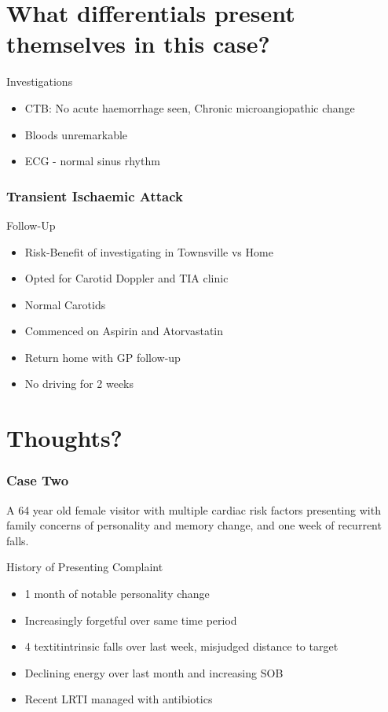 \documentclass[9pt, compress]{beamer}
\begin{document}
     \section{What differentials present themselves in this case?}
     
     \begin{frame}
     	Investigations
        \begin{itemize}
        	\item CTB: No acute haemorrhage seen, Chronic microangiopathic change
            \item Bloods unremarkable
            \item ECG - normal sinus rhythm
        \end{itemize}
     \end{frame}
     
     \begin{frame}
     	\frametitle{Transient Ischaemic Attack}
     \end{frame}
     
     \begin{frame}
     	Follow-Up
        \begin{itemize}
        	\item Risk-Benefit of investigating in Townsville vs Home
            \item Opted for Carotid Doppler and TIA clinic
            \item Normal Carotids
            \item Commenced on Aspirin and Atorvastatin
            \item Return home with GP follow-up
            \item No driving for 2 weeks
        \end{itemize}
     \end{frame}
     
     \section{Thoughts?}
     
     \begin{frame}
     	\frametitle{Case Two}
        A 64 year old female visitor with multiple cardiac risk factors presenting with family concerns of personality and memory change, and one week of recurrent falls.
     \end{frame}
     
     \begin{frame}
     	History of Presenting Complaint
        \begin{itemize}
        	\item 1 month of notable personality change
            \item Increasingly forgetful over same time period
            \item 4 textit{intrinsic} falls over last week, misjudged distance to target
            \item Declining energy over last month and increasing SOB
            \item Recent LRTI managed with antibiotics
        \end{itemize}
     \end{frame}
     
\end{document}
